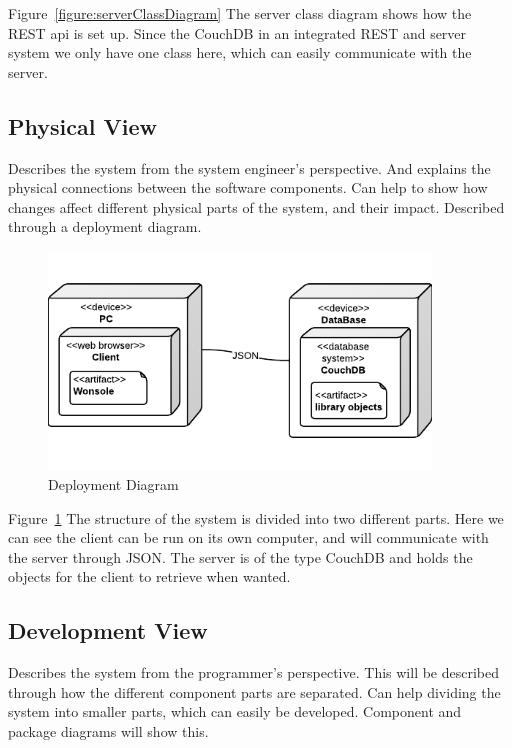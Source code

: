 Figure~\ref{figure:serverClassDiagram} The server class diagram shows how the REST api is set up. Since the CouchDB in an integrated REST and server system we only have one class here, which can easily communicate with the server.

\subsection{Physical View}
Describes the system from the system engineer's perspective. And explains the physical connections between the software components. Can help to show how changes affect different physical parts of the system, and their impact. Described through a deployment diagram. 

\begin{figure}[h]
\centering
\includegraphics[width=4in]{image/architecture/DeploymentDiagram.png}
\caption{Deployment Diagram}
\label{figure:DeploymentDiagram}
\end{figure}

Figure~\ref{figure:DeploymentDiagram} The structure of the system is divided into two different parts. Here we can see the client can be run on its own computer, and will communicate with the server through JSON. The server is of the type CouchDB and holds the objects for the client to retrieve when wanted.  


\subsection{Development View}
Describes the system from the programmer's perspective. This will be described through how the different component parts are separated. Can help dividing the system into smaller parts, which can easily be developed. Component and package diagrams will show this.

